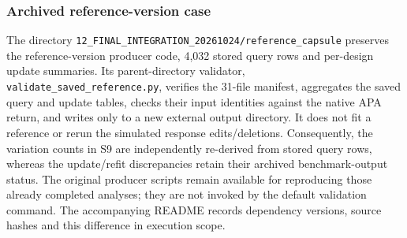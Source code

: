 \documentclass[11pt]{article}
\begin{document}
\subsubsection{Archived reference-version case}
The directory \nolinkurl{12_FINAL_INTEGRATION_20261024/reference_capsule} preserves the reference-version producer code, 4,032 stored query rows and per-design update summaries. Its parent-directory validator, \nolinkurl{validate_saved_reference.py}, verifies the 31-file manifest, aggregates the saved query and update tables, checks their input identities against the native APA return, and writes only to a new external output directory. It does not fit a reference or rerun the simulated response edits/deletions. Consequently, the variation counts in S9 are independently re-derived from stored query rows, whereas the update/refit discrepancies retain their archived benchmark-output status. The original producer scripts remain available for reproducing those already completed analyses; they are not invoked by the default validation command. The accompanying README records dependency versions, source hashes and this difference in execution scope.
\end{document}
